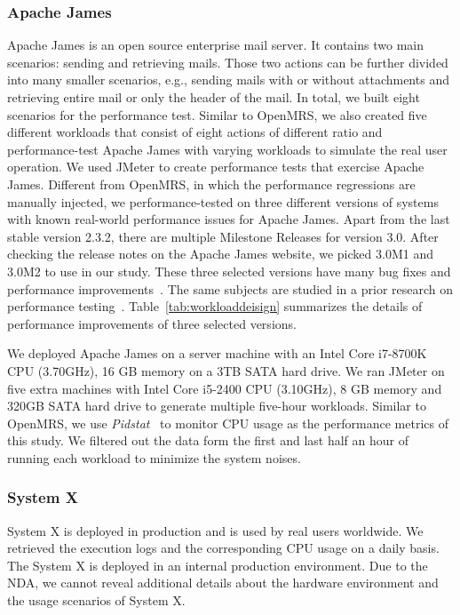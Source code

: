 \subsubsection{Apache James}
Apache James is an open source enterprise mail server. It contains two main scenarios: sending and retrieving mails. Those two actions can be further divided into many smaller scenarios, e.g., sending mails with or without attachments and retrieving entire mail or only the header of the mail. In total, we built eight scenarios for the performance test. Similar to OpenMRS, we also created five different workloads that consist of eight actions of different ratio and performance-test Apache James with varying workloads to simulate the real user operation. We used JMeter to create performance tests that exercise Apache James. Different from OpenMRS, in which the performance regressions are manually injected, we performance-tested on three different versions of systems with known real-world performance issues for Apache James. Apart from the last stable version 2.3.2, there are multiple Milestone Releases for version 3.0. After checking the release notes on the Apache James website, we picked 3.0M1 and 3.0M2 to use in our study. These three selected versions have many bug fixes and performance improvements~\citep{Apache-James}. The same subjects are studied in a prior research on performance testing~\citep{DBLP:conf/icst/GaoJBL16}. Table~\ref{tab:workloaddeisign} summarizes the details of performance improvements of three selected versions. 

We deployed Apache James on a server machine with an Intel Core i7-8700K CPU (3.70GHz), 16 GB memory on a 3TB SATA hard drive. We ran JMeter on five extra machines with Intel Core i5-2400 CPU (3.10GHz), 8 GB memory and 320GB SATA hard drive to generate multiple five-hour workloads. Similar to OpenMRS, we use \emph{Pidstat}~\citep{pidstat} to monitor CPU usage as the performance metrics of this study. We filtered out the data form the first and last half an hour of running each workload to minimize the system noises. 

\subsubsection{System X}
System X is deployed in production and is used by real users worldwide. We retrieved the execution logs and the corresponding CPU usage on a daily basis. The System X is deployed in an internal production environment. Due to the NDA, we cannot reveal additional details about the hardware environment and the usage scenarios of System X.

